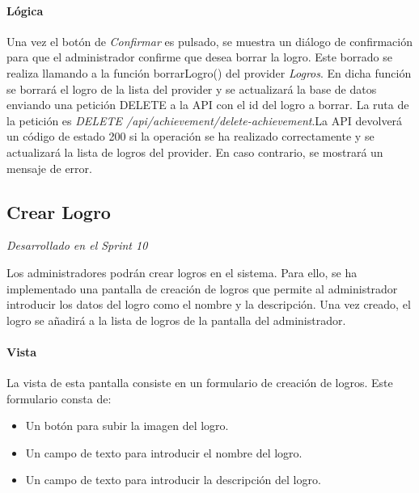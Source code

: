 \paragraph*{Lógica}
Una vez el botón de \textit{Confirmar} es pulsado, se muestra un diálogo de confirmación para que el administrador confirme que desea borrar la logro.
Este borrado se realiza llamando a la función borrarLogro() del provider \textit{Logros}. En dicha función se borrará el logro de la lista del provider y se actualizará la base de datos enviando
una petición DELETE a la API con el id del logro a borrar. La ruta de la petición es \textit{DELETE /api/achievement/delete-achievement}.La API devolverá un código de estado 200 si la operación se ha realizado correctamente y se actualizará la lista de logros del provider. En caso contrario, se mostrará un mensaje de error.



\subsection{Crear Logro} 

\textit{Desarrollado en el Sprint 10}

Los administradores podrán crear logros en el sistema. Para ello, se ha implementado una pantalla de creación de logros que permite al administrador introducir los datos del logro como el nombre y la descripción. Una vez creado, el logro se añadirá a la lista de logros de la pantalla del administrador.


\paragraph*{Vista}
La vista de esta pantalla consiste en un formulario de creación de logros. Este formulario consta de:
\begin{itemize}
  \item Un botón para subir la imagen del logro.
  \item Un campo de texto para introducir el nombre del logro.
  \item Un campo de texto para introducir la descripción del logro.
\end{itemize}

